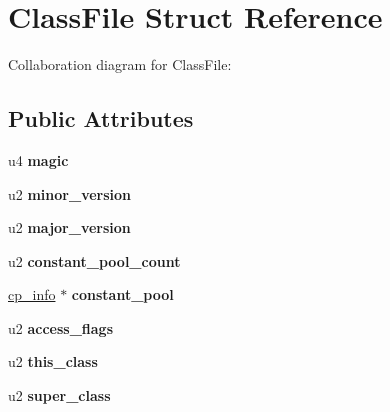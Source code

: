 \hypertarget{structClassFile}{}\section{Class\+File Struct Reference}
\label{structClassFile}


Collaboration diagram for Class\+File\+:
\subsection*{Public Attributes}
\begin{DoxyCompactItemize}
\item 
u4 {\bfseries magic}\hypertarget{structClassFile_a09085e9db513dae2f46da6e0a26c1b59}{}\label{structClassFile_a09085e9db513dae2f46da6e0a26c1b59}

\item 
u2 {\bfseries minor\+\_\+version}\hypertarget{structClassFile_af0db7b0ea01cb9cea2cee177ca81df09}{}\label{structClassFile_af0db7b0ea01cb9cea2cee177ca81df09}

\item 
u2 {\bfseries major\+\_\+version}\hypertarget{structClassFile_abede9cb937e65072517d0ee6e26e2757}{}\label{structClassFile_abede9cb937e65072517d0ee6e26e2757}

\item 
u2 {\bfseries constant\+\_\+pool\+\_\+count}\hypertarget{structClassFile_ac8fdf5cccfd632da4fdb21ae63fffa7a}{}\label{structClassFile_ac8fdf5cccfd632da4fdb21ae63fffa7a}

\item 
\hyperlink{structcp__info}{cp\+\_\+info} $\ast$ {\bfseries constant\+\_\+pool}\hypertarget{structClassFile_a2309d843091aad79aed04ce92470a434}{}\label{structClassFile_a2309d843091aad79aed04ce92470a434}

\item 
u2 {\bfseries access\+\_\+flags}\hypertarget{structClassFile_ae88db578147f7ee0d6fc1aeacb341854}{}\label{structClassFile_ae88db578147f7ee0d6fc1aeacb341854}

\item 
u2 {\bfseries this\+\_\+class}\hypertarget{structClassFile_a2d33db0a560a71b94bc572dd1e4ec03a}{}\label{structClassFile_a2d33db0a560a71b94bc572dd1e4ec03a}

\item 
u2 {\bfseries super\+\_\+class}\hypertarget{structClassFile_a5f6c11c0ccb02fd992b5c102725253ec}{}\label{structClassFile_a5f6c11c0ccb02fd992b5c102725253ec}


\end{DoxyCompactItemize}
